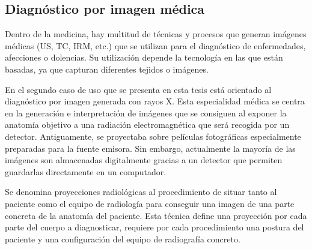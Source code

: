 \subsection{Diagnóstico por imagen médica}
\label{art:xraysim}

Dentro de la medicina, hay multitud de técnicas y procesos que generan imágenes médicas (\ac{US}, \ac{TC}, \ac{IRM}, etc.)  que se utilizan para el diagnóstico de enfermedades, afecciones o dolencias. %
Su utilización depende la tecnología en las que están basadas, ya que capturan diferentes tejidos o imágenes.

En el segundo caso de uso que se presenta en esta tesis está orientado al diagnóstico por imagen generada con rayos X. Esta especialidad médica se centra en la generación e interpretación de imágenes que se consiguen al exponer la anatomía objetivo a una radiación electromagnética que será recogida por un detector. Antiguamente, se proyectaba sobre películas fotográficas especialmente preparadas para la fuente emisora. Sin embargo, actualmente la mayoría de las imágenes son almacenadas digitalmente gracias a un detector que permiten guardarlas directamente en un computador.

Se denomina proyecciones radiológicas al procedimiento de situar tanto al paciente como el equipo de radiología para conseguir una imagen de una parte concreta de la anatomía del paciente. Esta técnica define una proyección por cada parte del cuerpo a diagnosticar, requiere por cada procedimiento una postura del paciente y una configuración del equipo de radiografía concreto.

